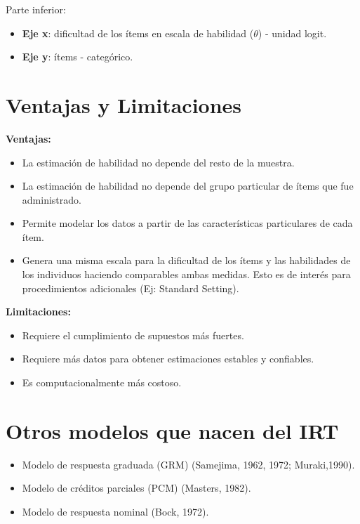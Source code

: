 \documentclass[
  letterpaper,
  DIV=11,
  numbers=noendperiod]{scrreprt}
\begin{document}
Parte inferior:

\begin{itemize}
\item
  \textbf{Eje x}: dificultad de los ítems en escala de habilidad
  (\(\theta\)) - unidad logit.
\item
  \textbf{Eje y}: ítems - categórico.
\end{itemize}

\section{\texorpdfstring{\textbf{Ventajas y
Limitaciones}}{Ventajas y Limitaciones}}\label{ventajas-y-limitaciones-1}

\textbf{Ventajas:}

\begin{itemize}
\item
  La estimación de habilidad no depende del resto de la muestra.
\item
  La estimación de habilidad no depende del grupo particular de ítems
  que fue administrado.
\item
  Permite modelar los datos a partir de las características particulares
  de cada ítem.
\item
  Genera una misma escala para la dificultad de los ítems y las
  habilidades de los individuos haciendo comparables ambas medidas. Esto
  es de interés para procedimientos adicionales (Ej: Standard Setting).
\end{itemize}

\textbf{Limitaciones:}

\begin{itemize}
\item
  Requiere el cumplimiento de supuestos más fuertes.
\item
  Requiere más datos para obtener estimaciones estables y confiables.
\item
  Es computacionalmente más costoso.
\end{itemize}

\section{Otros modelos que nacen del
IRT}\label{otros-modelos-que-nacen-del-irt}

\begin{itemize}
\item
  Modelo de respuesta graduada (GRM) (Samejima, 1962, 1972;
  Muraki,1990).
\item
  Modelo de créditos parciales (PCM) (Masters, 1982).
\item
  Modelo de respuesta nominal (Bock, 1972).
\end{itemize}
\end{document}
